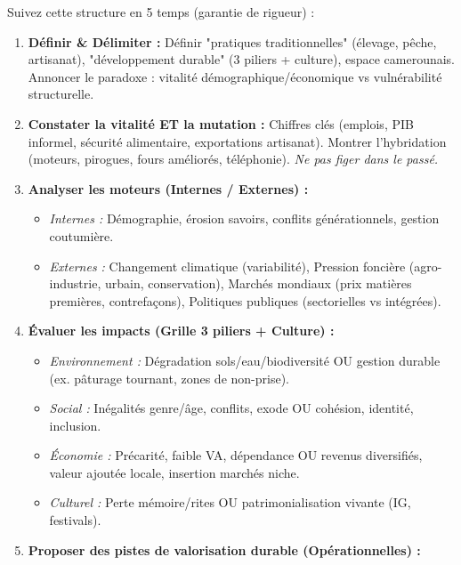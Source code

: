 \documentclass[11pt]{article}
\begin{document}
\begin{methode}
Suivez cette structure en 5 temps (garantie de rigueur) :
\begin{enumerate}
    \item \textbf{Définir \& Délimiter :} Définir "pratiques traditionnelles" (élevage, pêche, artisanat), "développement durable" (3 piliers + culture), espace camerounais. Annoncer le paradoxe : vitalité démographique/économique vs vulnérabilité structurelle.
    \item \textbf{Constater la vitalité ET la mutation :} Chiffres clés (emplois, PIB informel, sécurité alimentaire, exportations artisanat). Montrer l'hybridation (moteurs, pirogues, fours améliorés, téléphonie). \emph{Ne pas figer dans le passé.}
    \item \textbf{Analyser les moteurs (Internes / Externes) :} 
        \begin{itemize}
            \item \textit{Internes :} Démographie, érosion savoirs, conflits générationnels, gestion coutumière.
            \item \textit{Externes :} Changement climatique (variabilité), Pression foncière (agro-industrie, urbain, conservation), Marchés mondiaux (prix matières premières, contrefaçons), Politiques publiques (sectorielles vs intégrées).
        \end{itemize}
    \item \textbf{Évaluer les impacts (Grille 3 piliers + Culture) :}
        \begin{itemize}
            \item \textit{Environnement :} Dégradation sols/eau/biodiversité OU gestion durable (ex. pâturage tournant, zones de non-prise).
            \item \textit{Social :} Inégalités genre/âge, conflits, exode OU cohésion, identité, inclusion.
            \item \textit{Économie :} Précarité, faible VA, dépendance OU revenus diversifiés, valeur ajoutée locale, insertion marchés niche.
            \item \textit{Culturel :} Perte mémoire/rites OU patrimonialisation vivante (IG, festivals).
        \end{itemize}
    \item \textbf{Proposer des pistes de valorisation durable (Opérationnelles) :} 

\end{enumerate}
\end{methode}
\end{document}
